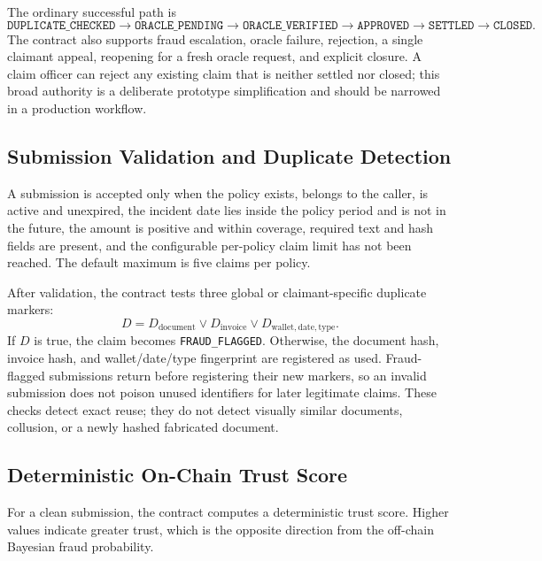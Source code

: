The ordinary successful path is
\begin{equation}
\texttt{DUPLICATE\_CHECKED}
\rightarrow \texttt{ORACLE\_PENDING}
\rightarrow \texttt{ORACLE\_VERIFIED}
\rightarrow \texttt{APPROVED}
\rightarrow \texttt{SETTLED}
\rightarrow \texttt{CLOSED}.
\end{equation}
The contract also supports fraud escalation, oracle failure, rejection, a
single claimant appeal, reopening for a fresh oracle request, and explicit
closure. A claim officer can reject any existing claim that is neither settled
nor closed; this broad authority is a deliberate prototype simplification and
should be narrowed in a production workflow.

\subsection{Submission Validation and Duplicate Detection}

A submission is accepted only when the policy exists, belongs to the caller, is
active and unexpired, the incident date lies inside the policy period and is not
in the future, the amount is positive and within coverage, required text and
hash fields are present, and the configurable per-policy claim limit has not
been reached. The default maximum is five claims per policy.

After validation, the contract tests three global or claimant-specific
duplicate markers:
\begin{equation}
D =
D_{\mathrm{document}}
\lor D_{\mathrm{invoice}}
\lor D_{\mathrm{wallet,date,type}}.
\label{eq:duplicate_rule}
\end{equation}
If \(D\) is true, the claim becomes \texttt{FRAUD\_FLAGGED}. Otherwise, the
document hash, invoice hash, and wallet/date/type fingerprint are registered as
used. Fraud-flagged submissions return before registering their new markers, so
an invalid submission does not poison unused identifiers for later legitimate
claims. These checks detect exact reuse; they do not detect visually similar
documents, collusion, or a newly hashed fabricated document.

\subsection{Deterministic On-Chain Trust Score}

For a clean submission, the contract computes a deterministic trust score.
Higher values indicate greater trust, which is the opposite direction from the
off-chain Bayesian fraud probability.

